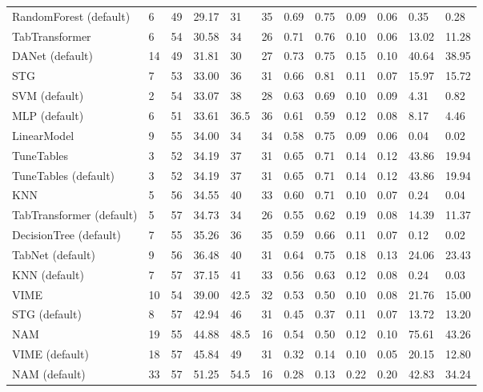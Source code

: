 \begin{tabular}{lllllrllllll}
RandomForest (default) & 6 & 49 & 29.17 & 31 & 35 & 0.69 & 0.75 & 0.09 & 0.06 & 0.35 & 0.28 \\
TabTransformer & 6 & 54 & 30.58 & 34 & 26 & 0.71 & 0.76 & 0.10 & 0.06 & 13.02 & 11.28 \\
DANet (default) & 14 & 49 & 31.81 & 30 & 27 & 0.73 & 0.75 & 0.15 & 0.10 & 40.64 & 38.95 \\
STG & 7 & 53 & 33.00 & 36 & 31 & 0.66 & 0.81 & 0.11 & 0.07 & 15.97 & 15.72 \\
SVM (default) & 2 & 54 & 33.07 & 38 & 28 & 0.63 & 0.69 & 0.10 & 0.09 & 4.31 & 0.82 \\
MLP (default) & 6 & 51 & 33.61 & 36.5 & 36 & 0.61 & 0.59 & 0.12 & 0.08 & 8.17 & 4.46 \\
LinearModel & 9 & 55 & 34.00 & 34 & 34 & 0.58 & 0.75 & 0.09 & 0.06 & 0.04 & 0.02 \\
TuneTables & 3 & 52 & 34.19 & 37 & 31 & 0.65 & 0.71 & 0.14 & 0.12 & 43.86 & 19.94 \\
TuneTables (default) & 3 & 52 & 34.19 & 37 & 31 & 0.65 & 0.71 & 0.14 & 0.12 & 43.86 & 19.94 \\
KNN & 5 & 56 & 34.55 & 40 & 33 & 0.60 & 0.71 & 0.10 & 0.07 & 0.24 & 0.04 \\
TabTransformer (default) & 5 & 57 & 34.73 & 34 & 26 & 0.55 & 0.62 & 0.19 & 0.08 & 14.39 & 11.37 \\
DecisionTree (default) & 7 & 55 & 35.26 & 36 & 35 & 0.59 & 0.66 & 0.11 & 0.07 & 0.12 & 0.02 \\
TabNet (default) & 9 & 56 & 36.48 & 40 & 31 & 0.64 & 0.75 & 0.18 & 0.13 & 24.06 & 23.43 \\
KNN (default) & 7 & 57 & 37.15 & 41 & 33 & 0.56 & 0.63 & 0.12 & 0.08 & 0.24 & 0.03 \\
VIME & 10 & 54 & 39.00 & 42.5 & 32 & 0.53 & 0.50 & 0.10 & 0.08 & 21.76 & 15.00 \\
STG (default) & 8 & 57 & 42.94 & 46 & 31 & 0.45 & 0.37 & 0.11 & 0.07 & 13.72 & 13.20 \\
NAM & 19 & 55 & 44.88 & 48.5 & 16 & 0.54 & 0.50 & 0.12 & 0.10 & 75.61 & 43.26 \\
VIME (default) & 18 & 57 & 45.84 & 49 & 31 & 0.32 & 0.14 & 0.10 & 0.05 & 20.15 & 12.80 \\
NAM (default) & 33 & 57 & 51.25 & 54.5 & 16 & 0.28 & 0.13 & 0.22 & 0.20 & 42.83 & 34.24 \\
\bottomrule
\end{tabular}
